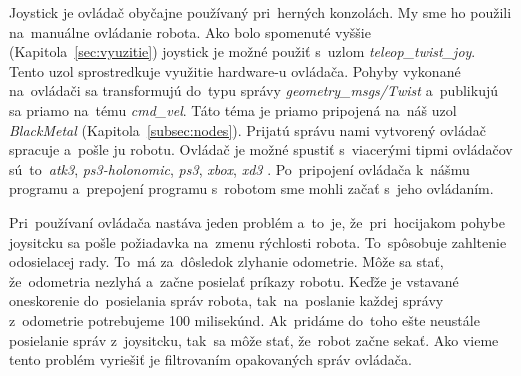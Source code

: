 Joystick je ovládač obyčajne používaný pri~herných konzolách. My sme ho použili na~manuálne ovládanie robota. Ako bolo
spomenuté vyššie (Kapitola~\ref{sec:vyuzitie}) joystick je možné použiť s~uzlom \textit{teleop\_twist\_joy}. Tento uzol
sprostredkuje využitie hardware-u ovládača. Pohyby vykonané na~ovládači sa transformujú do~typu správy
\textit{geometry\_msgs/Twist} a~publikujú sa priamo na~tému \textit{cmd\_vel}. Táto téma je priamo pripojená
na~náš uzol \textit{BlackMetal} (Kapitola~\ref{subsec:nodes}). Prijatú správu nami vytvorený ovládač spracuje a~pošle
ju robotu. Ovládač je možné spustiť s~viacerými tipmi ovládačov sú~to~\textit{atk3}, \textit{ps3-holonomic},
\textit{ps3}, \textit{xbox}, \textit{xd3} \cite{teleopjoy}. Po~pripojení ovládača k~nášmu programu a~prepojení
programu s~robotom sme mohli začať s~jeho ovládaním.

Pri~používaní ovládača nastáva jeden problém a~to~je, že~pri~hocijakom pohybe joysitcku sa pošle požiadavka na~zmenu
rýchlosti robota. To~spôsobuje zahltenie odosielacej rady. To~má za~dôsledok zlyhanie odometrie. Môže sa stať,
že~odometria nezlyhá a~začne posielať príkazy robotu. Keďže je vstavané oneskorenie do~posielania správ robota,
tak~na~poslanie každej správy z~odometrie potrebujeme 100 milisekúnd. Ak~pridáme do~toho ešte neustále posielanie správ
z~joysitcku, tak~sa môže stať, že~robot začne sekať. Ako vieme tento problém vyriešiť je filtrovaním opakovaných správ
ovládača.

